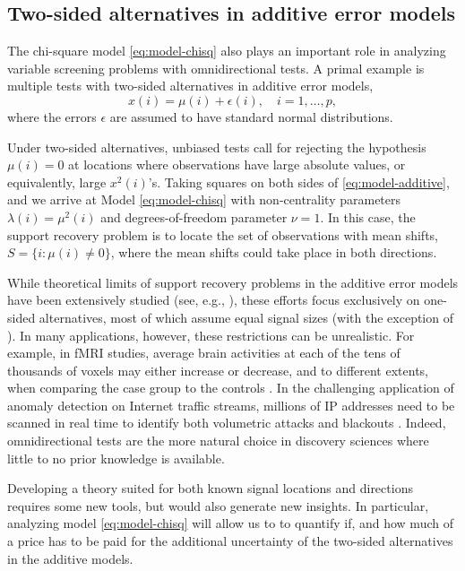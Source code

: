 \subsection{Two-sided alternatives in additive error models}
\label{subsec:motivation-additive}

The chi-square model \eqref{eq:model-chisq} also plays an important role in analyzing variable screening problems with omnidirectional tests.
A primal example is multiple tests with two-sided alternatives in additive error models,
\begin{equation} \label{eq:model-additive}
    x(i) = \mu(i) + \epsilon(i), \quad i=1,\ldots,p,
\end{equation}
where the errors $\epsilon$ are assumed to have standard normal distributions.

Under two-sided alternatives, unbiased tests call for rejecting the hypothesis $\mu(i)=0$ at locations where observations have large absolute values, or equivalently, large $x^2(i)$'s.
Taking squares on both sides of \eqref{eq:model-additive}, and we arrive at Model \eqref{eq:model-chisq} with non-centrality parameters $\lambda(i) = \mu^2(i)$ and degrees-of-freedom parameter $\nu =1$.
In this case, the support recovery problem is to locate the set of observations with mean shifts, $S=\{i:\mu(i)\neq 0\}$, where the mean shifts could take place in both directions.

While theoretical limits of support recovery problems in the additive error models have been extensively studied (see, e.g., \cite{arias2017distribution, butucea2018variable}), these efforts focus exclusively on one-sided alternatives, most of which assume equal signal sizes (with the exception of \cite{gao2018fundamental}).
In many applications, however, these restrictions can be unrealistic.
For example, in fMRI studies, average brain activities at each of the tens of thousands of voxels may either increase or decrease, and to different extents, when comparing the case group to the controls \citep{narayan2015two}. 
In the challenging application of anomaly detection on Internet traffic streams, millions of IP addresses need to be scanned in real time to identify both volumetric attacks and blackouts \citep{kallitsis2016amon}.
Indeed, omnidirectional tests are the more natural choice in discovery sciences where little to no prior knowledge is available.

Developing a theory suited for both known signal locations and directions requires some new tools, but would also generate new insights.
In particular, analyzing model \eqref{eq:model-chisq} will allow us to to quantify if, and how much of a price has to be paid for the additional uncertainty of the two-sided alternatives in the additive models.

